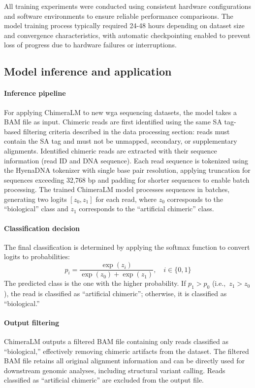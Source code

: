 \documentclass[pdflatex,sn-nature]{sn-jnl}%
\theoremstyle{thmstyleone}%
\theoremstyle{thmstyletwo}%
\theoremstyle{thmstylethree}%
\begin{document}
All training experiments were conducted using consistent hardware configurations and software environments to ensure reliable performance comparisons.
The model training process typically required 24-48 hours depending on dataset size and convergence characteristics, with automatic checkpointing enabled to prevent loss of progress due to hardware failures or interruptions.

\subsection*{Model inference and application}

\paragraph{Inference pipeline}
For applying ChimeraLM to new \gls{wga} sequencing datasets, the model takes a BAM file as input.
Chimeric reads are first identified using the same SA tag-based filtering criteria described in the data processing section: reads must contain the SA tag and must not be unmapped, secondary, or supplementary alignments.
Identified chimeric reads are extracted with their sequence information (read ID and DNA sequence).
Each read sequence is tokenized using the HyenaDNA tokenizer with single base pair resolution, applying truncation for sequences exceeding 32,768 bp and padding for shorter sequences to enable batch processing.
The trained ChimeraLM model processes sequences in batches, generating two logits $[z_0, z_1]$ for each read, where $z_0$ corresponds to the ``biological'' class and $z_1$ corresponds to the ``artificial chimeric'' class.

\paragraph{Classification decision}
The final classification is determined by applying the softmax function to convert logits to probabilities:
$$
	p_i = \frac{\exp(z_i)}{\exp(z_0) + \exp(z_1)}, \quad i \in \{0, 1\}
$$
The predicted class is the one with the higher probability. If $p_1 > p_0$ (i.e.,\ $z_1 > z_0$), the read is classified as ``artificial chimeric''; otherwise, it is classified as ``biological.''

\paragraph{Output filtering}
ChimeraLM outputs a filtered BAM file containing only reads classified as ``biological,'' effectively removing chimeric artifacts from the dataset.
The filtered BAM file retains all original alignment information and can be directly used for downstream genomic analyses, including structural variant calling.
Reads classified as ``artificial chimeric'' are excluded from the output file.
\end{document}
